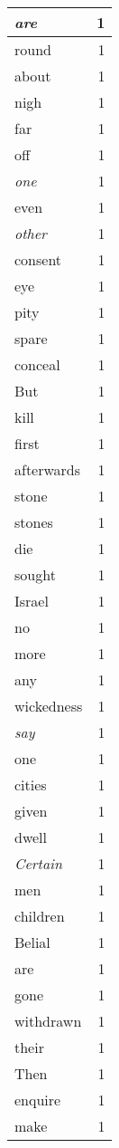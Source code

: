 \begin{center}
\begin{longtable}{l|r}
\emph{are} & 1 \\ \hline
round & 1 \\ \hline
about & 1 \\ \hline
nigh & 1 \\ \hline
far & 1 \\ \hline
off & 1 \\ \hline
\emph{one} & 1 \\ \hline
even & 1 \\ \hline
\emph{other} & 1 \\ \hline
consent & 1 \\ \hline
eye & 1 \\ \hline
pity & 1 \\ \hline
spare & 1 \\ \hline
conceal & 1 \\ \hline
But & 1 \\ \hline
kill & 1 \\ \hline
first & 1 \\ \hline
afterwards & 1 \\ \hline
stone & 1 \\ \hline
stones & 1 \\ \hline
die & 1 \\ \hline
sought & 1 \\ \hline
Israel & 1 \\ \hline
no & 1 \\ \hline
more & 1 \\ \hline
any & 1 \\ \hline
wickedness & 1 \\ \hline
\emph{say} & 1 \\ \hline
one & 1 \\ \hline
cities & 1 \\ \hline
given & 1 \\ \hline
dwell & 1 \\ \hline
\emph{Certain} & 1 \\ \hline
men & 1 \\ \hline
children & 1 \\ \hline
Belial & 1 \\ \hline
are & 1 \\ \hline
gone & 1 \\ \hline
withdrawn & 1 \\ \hline
their & 1 \\ \hline
Then & 1 \\ \hline
enquire & 1 \\ \hline
make & 1 \\ \hline

\end{longtable}
\end{center}
